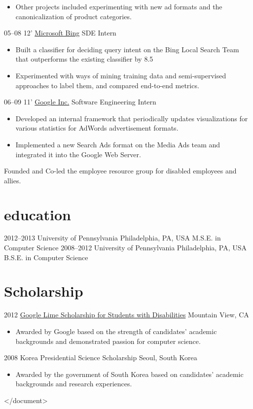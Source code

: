 \documentclass[]{patyoon-cv}
\begin{document}
\begin{entrylist}
{\begin{itemize}
\item Other projects included experimenting with new ad formats and the canonicalization of product categories.
\end{itemize}
}
\entry
{05–08 12'}
{\href{http://bing.com/}{Microsoft Bing}}
{SDE Intern}
{\begin{itemize}
\item Built a classifier for deciding query intent on the Bing Local Search Team that outperforms the existing classifier by 8.5%
\item Experimented with ways of mining training data and semi-supervised approaches to label them, and compared end-to-end metrics.
\end{itemize}}
\entry
{06–09 11'}
{\href{[http://www.google.com](http://www.google.com/)}{Google Inc.}}
{Software Engineering Intern}
{\begin{itemize}
\item Developed an internal framework that periodically updates visualizations for various statistics for AdWords advertisement formats.
\item Implemented a new Search Ads format on the Media Ads team and integrated it into the Google Web Server.
\end{itemize}}
\end{entrylist}

Founded and Co-led the employee resource group for disabled employees
and allies.

\section{education}

\begin{entrylist}
\entry
{2012–2013}
{University of Pennsylvania}
{Philadelphia, PA, USA}
{M.S.E. in Computer Science}
\entry
{2008–2012}
{University of Pennsylvania}
{Philadelphia, PA, USA}
{B.S.E. in Computer Science}
\end{entrylist}

\section{Scholarship}

\begin{entrylist}
\entry
{2012} {\href{http://www.limeconnect.com/opportunities/page/google-lime-scholarship-program}
{Google Lime Scholarship for Students with Disabilities}}
{Mountain View, CA}
{\begin{itemize}
\item Awarded by Google based on the strength of candidates' academic backgrounds and demonstrated passion for computer science.
\end{itemize}
}
\entry
{2008}
{Korea Presidential Science Scholarship}
{Seoul, South Korea}
{\begin{itemize}
\item Awarded by the government of South Korea based on candidates' academic backgrounds and research experiences.
\end{itemize}
</document>
  }
\end{entrylist}
\end{document}
